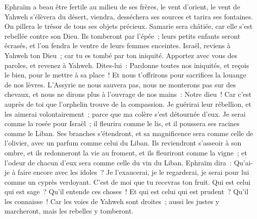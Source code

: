 \begin{multicols}{2}
Ephraïm a beau être fertile au milieu de ses frères, le vent d'orient, le vent de Yahweh s'élèvera du désert, viendra, desséchera ses sources et tarira ses fontaines. On pillera le trésor de tous ses objets précieux.
Samarie sera châtiée, car elle s'est rebellée contre son Dieu. Ils tomberont par l'épée~; leurs petits enfants seront écrasés, et l'on fendra le ventre de leurs femmes enceintes.
\VerseOne{}Israël, reviens à Yahweh ton Dieu~; car tu es tombé par ton iniquité.
Apportez avec vous des paroles, et revenez à Yahweh. Dites-lui~: Pardonne toutes nos iniquités, et reçois le bien, pour le mettre à sa place~! Et nous t'offrirons pour sacrifices la louange de nos lèvres.
L'Assyrie ne nous sauvera pas, nous ne monterons pas sur des chevaux, et nous ne dirons plus à l'ouvrage de nos mains~: Notre dieu~! Car c'est auprès de toi que l'orphelin trouve de la compassion.
Je guérirai leur rébellion, et les aimerai volontairement~; parce que ma colère s'est détournée d'eux.
Je serai comme la rosée pour Israël~; il fleurira comme le lis, et il poussera ses racines comme le Liban.
Ses branches s'étendront, et sa magnificence sera comme celle de l'olivier, avec un parfum comme celui du Liban.
Ils reviendront s'asseoir à son ombre, et ils redonneront la vie au froment, et ils fleuriront comme la vigne~; et l'odeur de chacun d'eux sera comme celle du vin du Liban.
Ephraïm dira~: Qu'ai-je à faire encore avec les idoles~? Je l'exaucerai, je le regarderai, je serai pour lui comme un cyprès verdoyant. C'est de moi que tu recevras ton fruit.
Qui est celui qui est sage~? Qu'il entende ces choses~! Et qui est celui qui est prudent~? Qu'il les connaisse~! Car les voies de Yahweh sont droites~; aussi les justes y marcheront, mais les rebelles y tomberont.
\PPE{}
\end{multicols}
